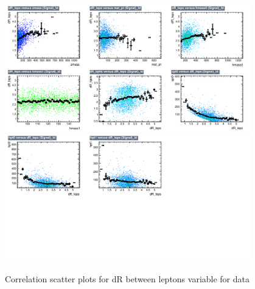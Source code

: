 \begin{figure}[!htb]%
\centering
\includegraphics[width=0.95\textwidth]{figures/CRTT/dataset/plots/correlationscatter_dR_leps__Id_c1.pdf}
\includegraphics[width=0.95\textwidth]{figures/CRTT/dataset/plots/correlationscatter_dR_leps__Id_c2.pdf}
\caption{ Correlation scatter plots for dR between leptons variable for data}%
\label{fig:correlations_CRTT_drleps_S}                                                       
\end{figure}




